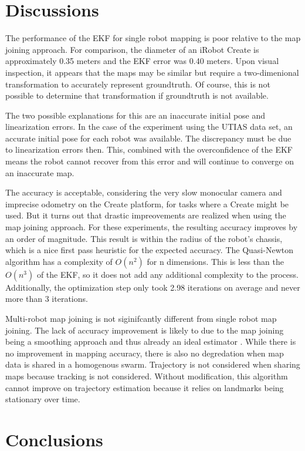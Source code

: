 \documentclass[12pt]{report}
\begin{document}
\chapter{Discussions}

The performance of the EKF for single robot mapping is poor relative
to the map joining approach. For comparison, the diameter of an iRobot
Create is approximately 0.35 meters and the EKF error was 0.40 meters.
Upon visual inspection, it appears that the maps may be similar but
require a two-dimenional transformation to accurately represent
groundtruth. Of course, this is not possible to determine that
transformation if groundtruth is not available.

The two possible explanations for this are an inaccurate initial pose
and linearization errors. In the case of the experiment using the
UTIAS data set, an accurate initial pose for each robot was available.
The discrepancy must be due to linearization errors then. This,
combined with the overconfidence of the EKF means the robot cannot
recover from this error and will continue to converge on an inaccurate
map.

The accuracy is acceptable, considering the very slow monocular camera
and imprecise odometry on the Create platform, for tasks where a
Create might be used. But it turns out that drastic impreovements are
realized when using the map joining approach. For these experiments,
the resulting accuracy improves by an order of magnitude. This result
is within the radius of the robot's chassis, which is a nice first
pass heuristic for the expected accuracy. The Quasi-Newton algorithm
has a complexity of $O(n^2)$ \cite{matlab} for n dimensions. This is
less than the $O(n^3)$ of the EKF, so it does not add any additional
complexity to the process. Additionally, the optimization step only
took 2.98 iterations on average and never more than 3 iterations.

Multi-robot map joining is not siginifcantly different from single
robot map joining. The lack of accuracy improvement is likely to due
to the map joining being a smoothing approach and thus already an
ideal estimator \cite{estimators}. While there is no improvement in
mapping accuracy, there is also no degredation when map data is shared
in a homogenous swarm. Trajectory is not considered when sharing maps
because tracking is not considered. Without modification, this
algorithm cannot improve on trajectory estimation because it relies on
landmarks being stationary over time.


\chapter{Conclusions}
\end{document}
